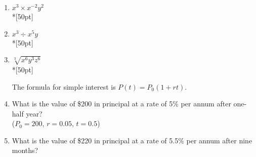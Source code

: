 \documentclass[12pt, twoside]{article}
\begin{document}
\begin{enumerate}
\item $x^3 \times x^{-2}y^2$\\*[50pt]
\item $x^3 \div x^{5}y$\\*[50pt]

\item $\sqrt[3]{x^6y^3z^6}$\\*[50pt]

  The formula for simple interest is $P(t)=P_0(1+rt)$.
\item   What is the value of \$200 in principal at a rate of 5\%  per annum after one-half year?\\
  ($P_0=200$, $r=0.05$, $t=0.5$) \vspace{2cm}
\item   What is the value of \$220 in principal at a rate of 5.5\%  per annum after nine months?

\end{enumerate}
\end{document}
